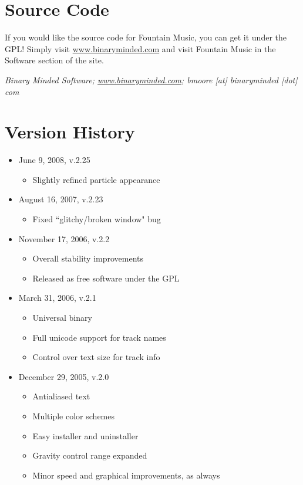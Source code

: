 \documentclass[11pt]{article}
\begin{document}
\section*{Source Code}
If you would like the source code for Fountain Music, you can get it under the GPL!  Simply visit \href{www.binaryminded.com}{www.binaryminded.com} and visit Fountain Music in the Software section of the site.

\emph{Binary Minded Software; \href{www.binaryminded.com}{www.binaryminded.com}; bmoore [at] binaryminded [dot] com}

\section*{Version History}
\begin{itemize}
\item June 9, 2008, v.2.25
\begin{itemize}
    \item Slightly refined particle appearance
\end{itemize}
    
\item August 16, 2007, v.2.23
\begin{itemize}
    \item Fixed ``glitchy/broken window" bug
\end{itemize}

\item November 17, 2006, v.2.2
\begin{itemize}
\item Overall stability improvements
\item Released as free software under the GPL
\end{itemize}

\item March 31, 2006, v.2.1
\begin{itemize}
\item Universal binary
\item Full unicode support for track names
\item Control over text size for track info
\end{itemize}

\item December 29, 2005, v.2.0
\begin{itemize}
\item Antialiased text
\item Multiple color schemes
\item Easy installer and uninstaller
\item Gravity control range expanded
\item Minor speed and graphical improvements, as always
\end{itemize}


\end{itemize}
\end{document}
